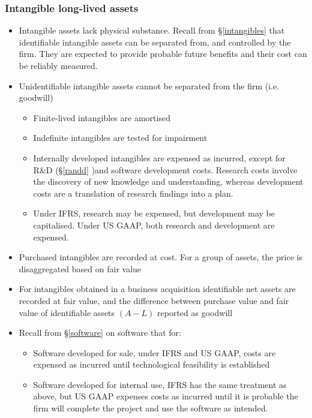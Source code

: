 \documentclass[../notes_compiled.tex]{subfiles}
\begin{document}
\subsubsection{Intangible long-lived assets}
\begin{itemize}
\item Intangible assets lack physical substance. Recall from \S\ref{intangibles} that identifiable intangible assets can be separated from, and controlled by the firm. They are expected to provide probable future benefits and their cost can be reliably measured. 
\item Unidentifiable intangible assets cannot be separated from the firm (i.e. goodwill)
\begin{itemize}
\item Finite-lived intangibles are amortised
\item Indefinite intangibles are tested for impairment
\item Internally developed intangibles are expensed as incurred, except for R\&D (\S\ref{randd} )and software development costs. Research costs involve the discovery of new knowledge and understanding, whereas development costs are a translation of research findings into a plan.
\item[] Under IFRS, research may be expensed, but development may be capitalised. Under US GAAP, both research and development are expensed.
\end{itemize}
\item Purchased intangibles are recorded at cost. For a group of assets, the price is disaggregated based on fair value
\item For intangibles obtained in a business acquisition identifiable net assets are recorded at fair value, and the difference between purchase value and fair value of identifiable assets $(A-L)$ reported as goodwill
\item Recall from \S\ref{software} on software that for:
\begin{itemize}
\item Software developed for sale, under IFRS and US GAAP, costs are expensed as incurred until technological feasibility is established
\item Software developed for internal use, IFRS has the same treatment as above, but US GAAP expenses costs as incurred until it is probable the firm will complete the project and use the software as intended.
\end{itemize}
\end{itemize}
\end{document}
